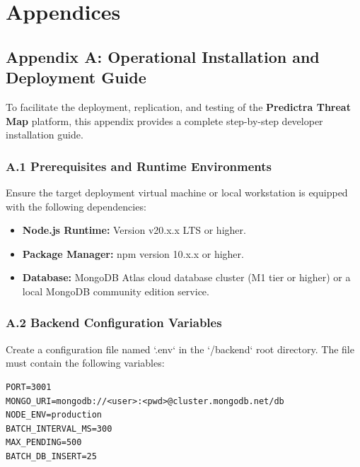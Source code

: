 \chapter*{Appendices}

\section*{Appendix A: Operational Installation and Deployment Guide}
To facilitate the deployment, replication, and testing of the \textbf{Predictra Threat Map} platform, this appendix provides a complete step-by-step developer installation guide.

\subsection*{A.1 Prerequisites and Runtime Environments}
Ensure the target deployment virtual machine or local workstation is equipped with the following dependencies:
\begin{itemize}
    \item \textbf{Node.js Runtime:} Version v20.x.x LTS or higher.
    \item \textbf{Package Manager:} npm version 10.x.x or higher.
    \item \textbf{Database:} MongoDB Atlas cloud database cluster (M1 tier or higher) or a local MongoDB community edition service.
\end{itemize}

\subsection*{A.2 Backend Configuration Variables}
Create a configuration file named `.env` in the `/backend` root directory. The file must contain the following variables:
\begin{verbatim}
PORT=3001
MONGO_URI=mongodb://<user>:<pwd>@cluster.mongodb.net/db
NODE_ENV=production
BATCH_INTERVAL_MS=300
MAX_PENDING=500
BATCH_DB_INSERT=25
\end{verbatim}

